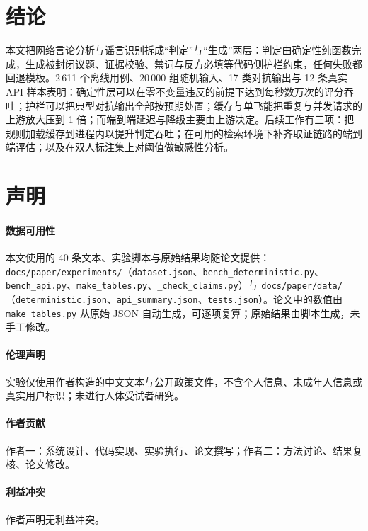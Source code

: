 \documentclass[12pt,a4paper,fontset=windows]{ctexart}
\begin{document}
\section{结论}\label{sec:conclusion}

本文把网络言论分析与谣言识别拆成“判定”与“生成”两层：判定由确定性纯函数完成，生成被封闭议题、证据校验、禁词与反方必填等代码侧护栏约束，任何失败都回退模板。2\,611 个离线用例、20\,000 组随机输入、17 类对抗输出与 12 条真实 API 样本表明：确定性层可以在零不变量违反的前提下达到每秒数万次的评分吞吐；护栏可以把典型对抗输出全部按预期处置；缓存与单飞能把重复与并发请求的上游放大压到 1 倍；而端到端延迟与降级主要由上游决定。后续工作有三项：把规则加载缓存到进程内以提升判定吞吐；在可用的检索环境下补齐取证链路的端到端评估；以及在双人标注集上对阈值做敏感性分析。

\section*{声明}

\paragraph{数据可用性}
\begin{sloppypar}
本文使用的 40 条文本、实验脚本与原始结果均随论文提供：\texttt{docs/paper/experiments/}（\texttt{dataset.json}、\texttt{bench\_deterministic.py}、\texttt{bench\_api.py}、\texttt{make\_tables.py}、\texttt{\_check\_claims.py}）与 \texttt{docs/paper/data/}（\texttt{deterministic.json}、\texttt{api\_summary.json}、\texttt{tests.json}）。论文中的数值由 \texttt{make\_tables.py} 从原始 JSON 自动生成，可逐项复算；原始结果由脚本生成，未手工修改。
\end{sloppypar}

\paragraph{伦理声明}
实验仅使用作者构造的中文文本与公开政策文件，不含个人信息、未成年人信息或真实用户标识；未进行人体受试者研究。

\paragraph{作者贡献}
作者一：系统设计、代码实现、实验执行、论文撰写；作者二：方法讨论、结果复核、论文修改。

\paragraph{利益冲突}
作者声明无利益冲突。
\end{document}
